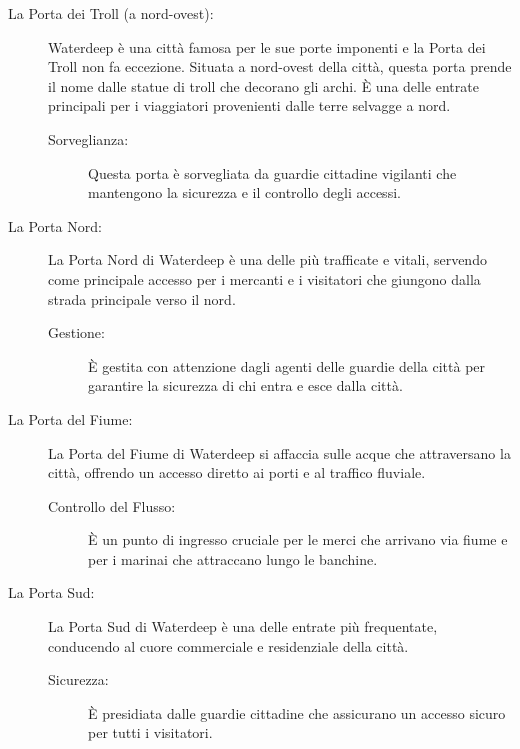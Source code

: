 \documentclass{article}
\begin{document}
                            \begin{description}
                                \item[La Porta dei Troll (a nord-ovest):] Waterdeep è una città famosa per le sue porte imponenti e la Porta dei Troll non fa eccezione. Situata a nord-ovest della città, questa porta prende il nome dalle statue di troll che decorano gli archi. È una delle entrate principali per i viaggiatori provenienti dalle terre selvagge a nord.
                                    \begin{description}
                                        \item[Sorveglianza:] Questa porta è sorvegliata da guardie cittadine vigilanti che mantengono la sicurezza e il controllo degli accessi.
                                    \end{description}

                                \item[La Porta Nord:] La Porta Nord di Waterdeep è una delle più trafficate e vitali, servendo come principale accesso per i mercanti e i visitatori che giungono dalla strada principale verso il nord.
                                    \begin{description}
                                        \item[Gestione:] È gestita con attenzione dagli agenti delle guardie della città per garantire la sicurezza di chi entra e esce dalla città.
                                    \end{description}

                                \item[La Porta del Fiume:] La Porta del Fiume di Waterdeep si affaccia sulle acque che attraversano la città, offrendo un accesso diretto ai porti e al traffico fluviale.
                                    \begin{description}
                                        \item[Controllo del Flusso:] È un punto di ingresso cruciale per le merci che arrivano via fiume e per i marinai che attraccano lungo le banchine.
                                    \end{description}

                                \item[La Porta Sud:] La Porta Sud di Waterdeep è una delle entrate più frequentate, conducendo al cuore commerciale e residenziale della città.
                                    \begin{description}
                                        \item[Sicurezza:] È presidiata dalle guardie cittadine che assicurano un accesso sicuro per tutti i visitatori.
                                    \end{description}


\end{description}
\end{document}

